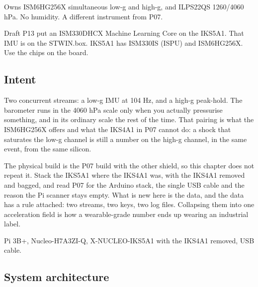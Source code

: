 
\begin{unique}
Owns ISM6HG256X simultaneous low-g and high-g, and ILPS22QS 1260/4060 hPa. No humidity.
A different instrument from P07.
\end{unique}

\begin{blueprint}
Draft P13 put an ISM330DHCX Machine Learning Core on the IKS5A1. That IMU is on the
STWIN.box. IKS5A1 has ISM330IS (ISPU) and ISM6HG256X. Use the chips on the board.
\end{blueprint}

\subsection*{Intent}

Two concurrent streams: a low-g IMU at 104 Hz, and a high-g peak-hold. The barometer runs
in the 4060 hPa scale only when you actually pressurise something, and in its ordinary
scale the rest of the time. That pairing is what the ISM6HG256X offers and what the
IKS4A1 in P07 cannot do: a shock that saturates the low-g channel is still a number on the
high-g channel, in the same event, from the same silicon.

The physical build is the P07 build with the other shield, so this chapter does not repeat
it. Stack the IKS5A1 where the IKS4A1 was, with the IKS4A1 removed and bagged, and read
P07 for the Arduino stack, the single USB cable and the reason the Pi scanner stays empty.
What is new here is the data, and the data has a rule attached: two streams, two keys, two
log files. Collapsing them into one acceleration field is how a wearable-grade number ends
up wearing an industrial label.

\begin{kit}
Pi 3B+, Nucleo-H7A3ZI-Q, X-NUCLEO-IKS5A1 with the IKS4A1 removed, USB cable.
\end{kit}

\subsection*{System architecture}


